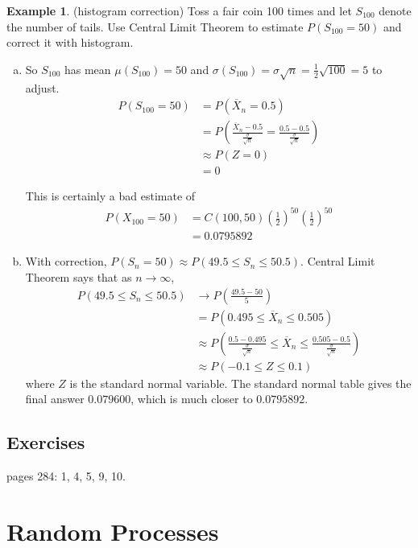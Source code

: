 \documentclass[12pt]{amsart}
\theoremstyle{definition}
\newtheorem{example}[theorem]{Example}
\begin{document}
\begin{example}(histogram correction) Toss a fair coin 100 times and let $S_{100}$ denote the number of tails. Use Central Limit Theorem to estimate $P(S_{100} = 50)$ and correct it with histogram.
\begin{enumerate}[a.]
\item So $S_{100}$ has mean $\mu(S_{100}) = 50$ and
$\sigma(S_{100}) = \sigma \sqrt n = \frac{1}{2}\sqrt{100} = 5$ to
adjust.
\begin{align*}
P(S_{100} = 50) & = P(\overline{X}_n = 0.5) \\
 & = P \left( \frac{\overline{X}_n - 0.5}{\frac{\sigma}{\sqrt n}} = \frac{0.5 - 0.5}{\frac{\sigma}{\sqrt n}} \right) \\
 & \approx P(Z = 0) \\
 & = 0
\end{align*}

This is certainly a bad estimate of
\begin{align*}
P(X_{100} = 50) & = C(100, 50) \left(\frac{1}{2} \right)^{50} \left( \frac{1}{2} \right)^{50} \\
 & = 0.0795892
\end{align*}
\item With correction, $P(S_n=50) \approx P(49.5 \leq S_n \leq 50.5)$. Central Limit Theorem says that as $n \to \infty$,
\begin{align*}
P(49.5 \leq S_n \leq 50.5) & \to P \left( \frac{49.5-50}{5} \right) \\
 & = P(0.495 \leq \overline{X}_n \leq 0.505) \\
 & \approx P \left( \frac{0.5 - 0.495}{\frac{\sigma}{\sqrt n}} \leq \overline{X}_n \leq \frac{0.505 - 0.5}{\frac{\sigma}{\sqrt n}} \right) \\
 & \approx P(-0.1 \leq Z \leq 0.1)
\end{align*}
where $Z$ is the standard normal variable. The standard normal table gives the final answer $0.079600$, which is much closer to $0.0795892$.
\end{enumerate}
\end{example}

\subsection{Exercises} pages 284: 1, 4, 5, 9, 10.

\section{Random Processes}
\end{document}
